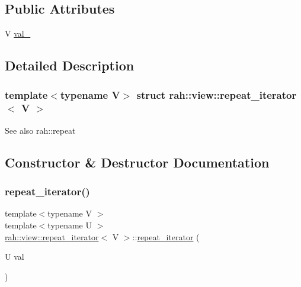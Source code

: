 \subsection*{Public Attributes}
\begin{DoxyCompactItemize}
\item 
V \mbox{\hyperlink{structrah_1_1view_1_1repeat__iterator_a6286ca38cb848630cb870dc6ab42eb79}{val\+\_\+}}
\end{DoxyCompactItemize}


\subsection{Detailed Description}
\subsubsection*{template$<$typename V$>$\newline
struct rah\+::view\+::repeat\+\_\+iterator$<$ V $>$}

\begin{DoxySeeAlso}{See also}
rah\+::repeat 
\end{DoxySeeAlso}


\subsection{Constructor \& Destructor Documentation}
\mbox{\label{structrah_1_1view_1_1repeat__iterator_af91bc578d1fe7d90373896abc8e56546}} 
\subsubsection{\texorpdfstring{repeat\_iterator()}{repeat\_iterator()}}
{\footnotesize\ttfamily template$<$typename V $>$ \\
template$<$typename U $>$ \\
\mbox{\hyperlink{structrah_1_1view_1_1repeat__iterator}{rah\+::view\+::repeat\+\_\+iterator}}$<$ V $>$\+::\mbox{\hyperlink{structrah_1_1view_1_1repeat__iterator}{repeat\+\_\+iterator}} (\begin{DoxyParamCaption}\item[{U}]{val }\end{DoxyParamCaption})\hspace{0.3cm}{\ttfamily [inline]}}



